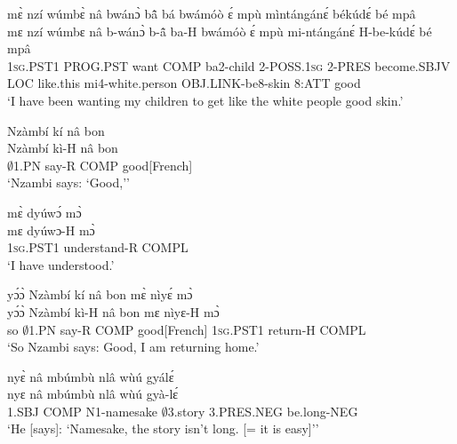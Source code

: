 \begin{exe} 
\exN\label{140}
  \glll mɛ̀ nzí wúmbɛ̀ nâ bwánɔ̀ bã̂ bá bwámóò ɛ́ mpù mìntángánɛ́ békúdɛ́ bé mpâ \\
        mɛ nzí wúmbɛ nâ b-wánɔ̀ b-ã̂ ba-H bwámóò ɛ́ mpù mi-ntángánɛ́ H-be-kúdɛ́ bé mpâ \\
        1\textsc{sg}.PST1 PROG.PST want COMP ba2-child 2-POSS.1\textsc{sg} 2-PRES become.SBJV LOC like.this mi4-white.person OBJ.LINK-be8-skin 8:ATT good \\
    \trans `I have been wanting my children to get like the white people good skin.'
\end{exe}

\begin{exe} 
\exN\label{141} 
  \glll Nzàmbí kí nâ bon \\
        Nzàmbí kì-H nâ bon \\
       $\emptyset$1.PN say-R COMP good[French]  \\
    \trans `Nzambi says: `Good,''
\end{exe}

\begin{exe} 
\exN\label{142}
  \glll mɛ̀ dyúwɔ́ mɔ̀ \\
       mɛ dyúwɔ-H mɔ̀ \\
        1\textsc{sg}.PST1 understand-R COMPL \\
    \trans `I have understood.'
\end{exe}

\begin{exe} 
\exN\label{143}
  \glll yɔ́ɔ̀ Nzàmbí kí nâ bon mɛ̀ nìyɛ́ mɔ̀\\
        yɔ́ɔ̀ Nzàmbí kì-H nâ bon mɛ nìyɛ-H mɔ̀\\
        so $\emptyset$1.PN say-R COMP good[French] 1\textsc{sg}.PST1 return-H COMPL\\
    \trans `So Nzambi says: Good, I am returning home.'
\end{exe}

\begin{exe} 
\exN\label{144} 
  \glll nyɛ̀ nâ mbúmbù nlâ wùú gyálɛ́ \\
         nyɛ nâ mbúmbù nlâ wùú gyà-lɛ́ \\
        1.SBJ COMP N1-namesake $\emptyset$3.story 3.PRES.NEG be.long-NEG \\
    \trans `He [says]: `Namesake, the story isn't long. [= it is easy]''
\end{exe}


